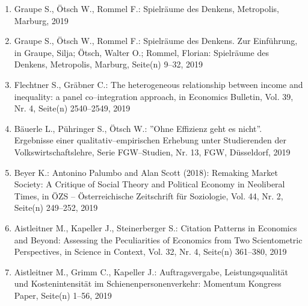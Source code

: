 \begin{enumerate}
	 \item Graupe S., Ötsch W., Rommel F.: Spielräume des Denkens, Metropolis, Marburg, 2019
	 \item Graupe S., Ötsch W., Rommel F.: Spielräume des Denkens. Zur Einführung, in Graupe, Silja; Ötsch, Walter O.; Rommel, Florian: Spielräume des Denkens, Metropolis, Marburg, Seite(n) 9--32, 2019
	 \item Flechtner S., Gräbner C.: The heterogeneous relationship between income and inequality: a panel co--integration approach, in Economics Bulletin, Vol. 39, Nr. 4, Seite(n) 2540–2549, 2019
	 \item Bäuerle L., Pühringer S., Ötsch W.: ''Ohne Effizienz geht es nicht''. Ergebnisse einer qualitativ--empirischen Erhebung unter Studierenden der Volkswirtschaftslehre, Serie FGW--Studien, Nr. 13, FGW, Düsseldorf, 2019
	 \item Beyer K.: Antonino Palumbo and Alan Scott (2018): Remaking Market Society: A Critique of Social Theory and Political Economy in Neoliberal Times, in ÖZS -- Österreichische Zeitschrift für Soziologie, Vol. 44, Nr. 2, Seite(n) 249--252, 2019
	 \item Aistleitner M., Kapeller J., Steinerberger S.: Citation Patterns in Economics and Beyond: Assessing the Peculiarities of Economics from Two Scientometric Perspectives, in Science in Context, Vol. 32, Nr. 4, Seite(n) 361--380, 2019
	 \item Aistleitner M., Grimm C., Kapeller J.: Auftragsvergabe, Leistungsqualität und Kostenintensität im Schienenpersonenverkehr: Momentum Kongress Paper, Seite(n) 1--56, 2019
\end{enumerate}

